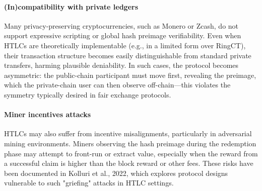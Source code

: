\paragraph*{(In)compatibility with private ledgers}
Many privacy-preserving cryptocurrencies, such as Monero or Zcash, do not support expressive scripting or global hash preimage verifiability. Even when HTLCs are theoretically implementable (e.g., in a limited form over RingCT), their transaction structure becomes easily distinguishable from standard private transfers, harming plausible deniability. In such cases, the protocol becomes asymmetric: the public-chain participant must move first, revealing the preimage, which the private-chain user can then observe off-chain—this violates the symmetry typically desired in fair exchange protocols.
\paragraph*{Miner incentives attacks} HTLCs may also suffer from incentive misalignments, particularly in adversarial mining environments. Miners observing the hash preimage during the redemption phase may attempt to front-run or extract value, especially when the reward from a successful claim is higher than the block reward or other fees. These risks have been documented in Kolluri et al., 2022, which explores protocol designs vulnerable to such "griefing" attacks in HTLC settings.
\newpage
